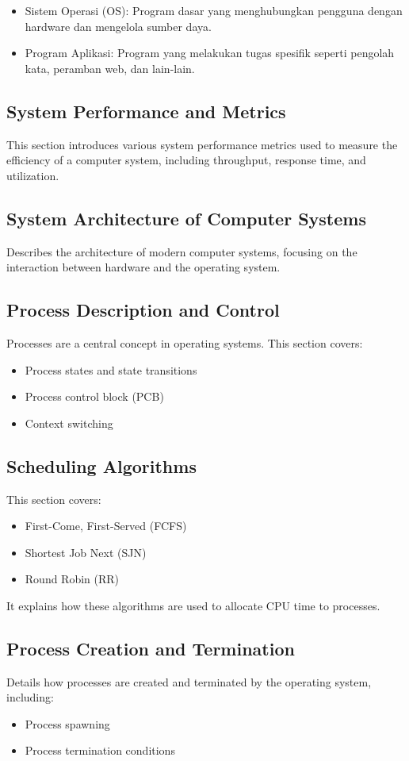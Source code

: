 \documentclass[12pt]{article}
\begin{document}
\begin{itemize}
    \item Sistem Operasi (OS): Program dasar yang menghubungkan pengguna dengan hardware dan mengelola sumber daya.
    \item Program Aplikasi: Program yang melakukan tugas spesifik seperti pengolah kata, peramban web, dan lain-lain.
\end{itemize}

\subsection{System Performance and Metrics}
This section introduces various system performance metrics used to measure the efficiency of a computer system, including throughput, response time, and utilization.

\subsection{System Architecture of Computer Systems}
Describes the architecture of modern computer systems, focusing on the interaction between hardware and the operating system.

\subsection{Process Description and Control}
Processes are a central concept in operating systems. This section covers:
\begin{itemize}
    \item Process states and state transitions
    \item Process control block (PCB)
    \item Context switching
\end{itemize}

\subsection{Scheduling Algorithms}
This section covers:
\begin{itemize}
    \item First-Come, First-Served (FCFS)
    \item Shortest Job Next (SJN)
    \item Round Robin (RR)
\end{itemize}
It explains how these algorithms are used to allocate CPU time to processes.

\subsection{Process Creation and Termination}
Details how processes are created and terminated by the operating system, including:
\begin{itemize}
    \item Process spawning
    \item Process termination conditions
\end{itemize}
\end{document}
